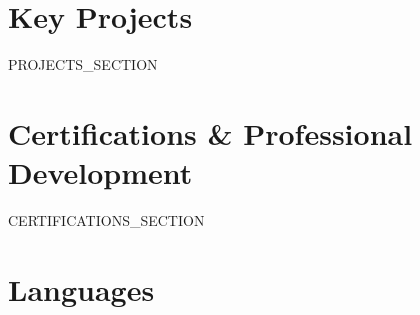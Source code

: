 \documentclass[10pt,a4paper]{article}
\begin{document}
\ifx{}\empty\else
\section{Key Projects}
{{PROJECTS_SECTION}}
\fi

\ifx{}\empty\else
\section{Certifications \& Professional Development}
{{CERTIFICATIONS_SECTION}}
\fi

\ifx{}\empty\else
\section{Languages}
\fi
\end{document}
